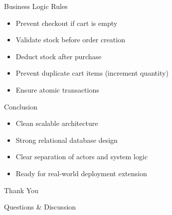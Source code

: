 \documentclass[10pt]{beamer}
\begin{document}
\begin{frame}{Business Logic Rules}

\begin{itemize}
\item Prevent checkout if cart is empty
\item Validate stock before order creation
\item Deduct stock after purchase
\item Prevent duplicate cart items (increment quantity)
\item Ensure atomic transactions
\end{itemize}

\end{frame}

\begin{frame}{Conclusion}

\begin{itemize}
\item Clean scalable architecture
\item Strong relational database design
\item Clear separation of actors and system logic
\item Ready for real-world deployment extension
\end{itemize}

\end{frame}

{
\begin{frame}
\centering
{\Huge \color{white} Thank You}

\vspace{0.5cm}
{\color{TechCyan} Questions \& Discussion}
\end{frame}
}
\end{document}
